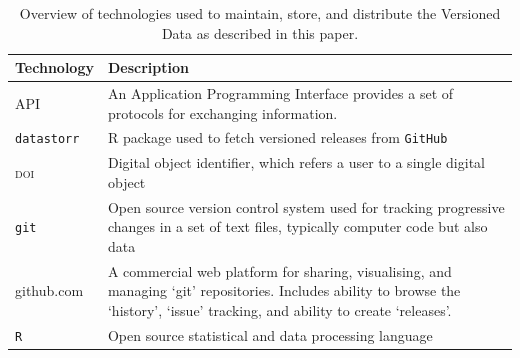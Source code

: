 \documentclass[a4paper,11pt]{article}
\begin{document}
\begin{table}[h!]
\centering
\caption{Overview of technologies used to maintain, store, and distribute the Versioned Data as described in this paper.}
{\footnotesize
\vspace{1cm}
  \begin{tabular}{p{5cm}p{10cm}}
  \hline
  \textbf{Technology} & \textbf{Description} \\\hline
  \textsc{API}   & An Application Programming Interface provides a set of protocols for exchanging information.\\
   \texttt{datastorr} & R package used to fetch versioned releases from \texttt{GitHub}  \\
   \textsc{doi} & Digital object identifier, which refers a user to a single digital object \\
   \texttt{git} & Open source version control system used for tracking progressive changes in a set of text files, typically computer code but also data\\
   github.com & A commercial web platform for sharing, visualising, and managing `git' repositories. Includes ability to browse the `history', `issue' tracking, and ability to create `releases'.\\
   \texttt{R}     &  Open source statistical and data processing language \\
   \hline
  \end{tabular}
  }
\label{tab:technologies}
\end{table}

\newpage
\end{document}
